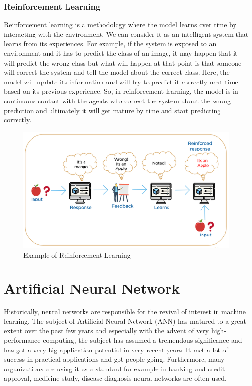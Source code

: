 \subsubsection{Reinforcement Learning}
\par
Reinforcement learning is a methodology where the model learns over time by interacting with the environment. We can consider it as an intelligent system that learns from its experiences. For example, if the system is exposed to an environment and it has to predict the class of an image, it may happen that it will predict the wrong class but what will happen at that point is that someone will correct the system and tell the model about the correct class. Here, the model will update its information and will try to predict it correctly next time based on its previous experience. So, in reinforcement learning, the model is in continuous contact with the agents who correct the system about the wrong prediction and ultimately it will get mature by time and start predicting correctly.
\begin{figure}[H]
\centering
\includegraphics[scale=0.7]{images/Chapter2/reinforcement-learning.png}
\caption{Example of Reinforcement Learning \cite{rei_learning}}
\label{ex-rl}
\end{figure}
\section{Artificial Neural Network}
Historically, neural networks are responsible for the revival of interest in machine learning. The subject of Artificial Neural Network (ANN) has matured to a great extent over the past few years and especially with the advent of very high-performance computing, the subject has assumed a tremendous significance and has got a very big application potential in very recent years. It met a lot of success in practical applications and got people going. Furthermore, many organizations are using it as a standard for example in banking and credit approval, medicine study, disease diagnosis neural networks are often used.
